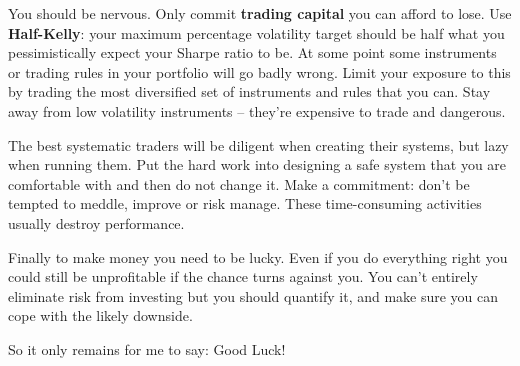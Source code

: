 You should be nervous. Only commit \textbf{trading capital} you can afford to lose. Use \textbf{Half-Kelly}: your maximum percentage volatility target should be half what you pessimistically expect your Sharpe ratio to be. At some point some instruments or trading rules in your portfolio will go badly wrong. Limit your exposure to this by trading the most diversified set of instruments and rules that you can. Stay away from low volatility instruments -- they're expensive to trade and dangerous.

The best systematic traders will be diligent when creating their systems, but lazy when running them. Put the hard work into designing a safe system that you are comfortable with and then do not change it. Make a commitment: don't be tempted to meddle, improve or risk manage. These time-consuming activities usually destroy performance.

Finally to make money you need to be lucky. Even if you do everything right you could still be unprofitable if the chance turns against you. You can't entirely eliminate risk from investing but you should quantify it, and make sure you can cope with the likely downside.

So it only remains for me to say: Good Luck!
